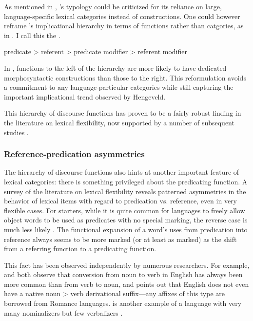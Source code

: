 
As mentioned in , \citeauthor{Hengeveld1992}'s typology could be criticized for its reliance on large, language-specific lexical categories instead of constructions. One could however reframe \citeauthor{Hengeveld1992}'s implicational hierarchy in terms of functions rather than catgories, as in . I call this the .

\begin{exe}
  \ex\label{ex:2.3} predicate > referent > predicate modifier > referent modifier
\end{exe}

\noindent In , functions to the left of the hierarchy are more likely to have dedicated morphosyntactic constructions than those to the right. This reformulation avoids a commitment to any language-particular categories while still capturing the important implicational trend observed by Hengeveld.

This hierarchy of discourse functions has proven to be a fairly robust finding in the literature on lexical flexibility, now supported by a number of subsequent studies .

\subsubsection{Reference-predication asymmetries}
\label{sec:2.3.2.2}

The hierarchy of discourse functions also hints at another important feature of lexical categories: there is something privileged about the predicating function. A survey of the literature on lexical flexibility reveals patterned asymmetries in the behavior of lexical items with regard to predication vs. reference, even in very flexible cases. For starters, while it is quite common for languages to freely allow object words to be used as predicates with no special marking, the reverse case is much less likely \textcite[745]{HopperThompson1984}. The functional expansion of a word's uses from predication into reference always seems to be more marked (or at least as marked) as the shift from a referring function to a predicating function.

This fact has been observed independently by numerous researchers. For example, \textcite[251]{Stevick1968} and \textcite[373--374]{Marchand1969} both observe that conversion from noun to verb in English has always been more common than from verb to noun, and \textcite[98]{Kastovsky1996} points out that English does not even have a native noun > verb derivational suffix—any affixes of this type are borrowed from Romance languages.  is another example of a language with very many nominalizers but few verbalizers \parencite[158]{Mithun2017}.

